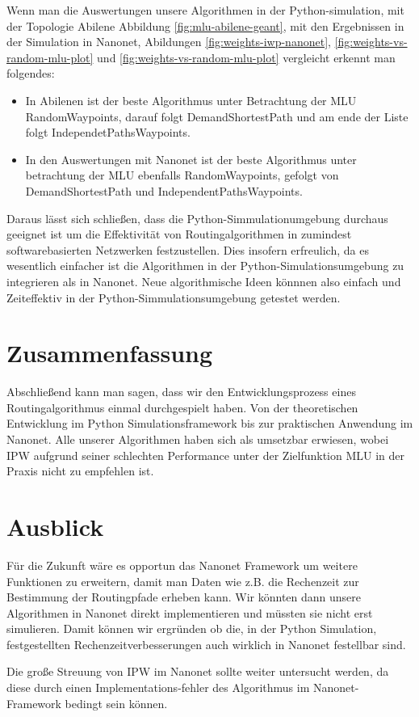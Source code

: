 \documentclass[sigconf,noacm,review]{acmart}
\begin{document}
Wenn man die Auswertungen unsere Algorithmen in der Python-simulation, mit der Topologie Abilene Abbildung \ref{fig:mlu-abilene-geant}, mit den Ergebnissen in der Simulation in Nanonet, Abildungen \ref{fig:weights-iwp-nanonet}, \ref{fig:weights-vs-random-mlu-plot} und \ref{fig:weights-vs-random-mlu-plot} vergleicht erkennt man folgendes:
\begin{itemize}
    \item In Abilenen ist der beste Algorithmus unter Betrachtung der MLU RandomWaypoints, darauf folgt DemandShortestPath und am ende der Liste folgt IndependetPathsWaypoints.
    \item In den Auswertungen mit Nanonet ist der beste Algorithmus unter betrachtung der MLU ebenfalls RandomWaypoints, gefolgt von DemandShortestPath und IndependentPathsWaypoints.
\end{itemize}
Daraus lässt sich schließen, dass die Python-Simmulationumgebung \cite{python-simmulation} durchaus geeignet ist um die Effektivität von Routingalgorithmen in
zumindest softwarebasierten Netzwerken festzustellen.
Dies insofern erfreulich, da es wesentlich einfacher ist die Algorithmen in der Python-Simulationsumgebung zu integrieren als in Nanonet.
Neue algorithmische Ideen könnnen also einfach und Zeiteffektiv in der Python-Simmulationsumgebung getestet werden. 
\section{Zusammenfassung}
Abschließend kann man sagen, dass wir den Entwicklungsprozess eines Routingalgorithmus einmal durchgespielt haben. Von der theoretischen Entwicklung im Python Simulationsframework bis zur praktischen Anwendung im Nanonet. Alle unserer Algorithmen haben sich als umsetzbar erwiesen, wobei IPW aufgrund seiner schlechten Performance unter der Zielfunktion MLU in der Praxis nicht zu empfehlen ist.
\section{Ausblick}
Für die Zukunft wäre es opportun das Nanonet Framework um weitere Funktionen zu erweitern, damit man Daten wie z.B. die Rechenzeit zur Bestimmung der Routingpfade erheben kann.
Wir könnten dann unsere Algorithmen in Nanonet direkt implementieren und müssten sie nicht erst simulieren.
Damit können wir ergründen ob die, in der Python Simulation, festgestellten Rechenzeitverbesserungen auch wirklich in Nanonet festellbar sind.

Die große Streuung von IPW im Nanonet sollte weiter untersucht werden, da diese durch einen Implementations-fehler des Algorithmus im Nanonet-Framework bedingt sein können.
\end{document}

